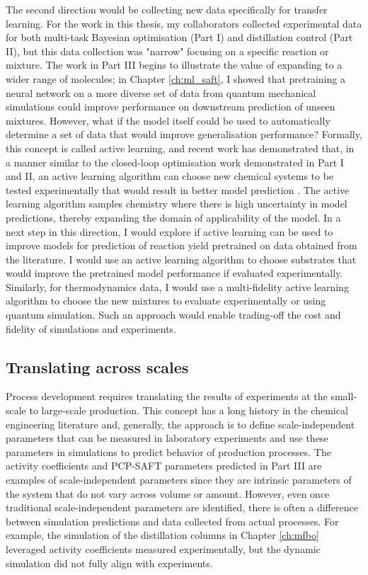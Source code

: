 The second direction would be collecting new data specifically for transfer learning. For the work in this thesis, my collaborators collected experimental data for both multi-task Bayesian optimisation (Part I) and distillation control (Part II), but this data collection was "narrow" focusing on a specific reaction or mixture. The work in Part III begins to illustrate the value of expanding to a wider range of molecules; in Chapter \ref{ch:ml_saft}, I showed that pretraining a neural network on a more diverse set of data from quantum mechanical simulations could improve performance on downstream prediction of unseen mixtures. However, what if the model itself could be used to automatically determine a set of data that would  improve generalisation performance? Formally, this concept is called active learning, and recent work has demonstrated that, in a manner similar to the closed-loop optimisation work demonstrated in Part I and II, an active learning algorithm can choose new chemical systems to be tested experimentally that would result in better model prediction \cite{Angello2022}. The active learning algorithm samples chemistry where there is high uncertainty in model predictions, thereby expanding the domain of applicability of the model.  In a next step in this direction, I would explore if active learning can be used to improve models for prediction of reaction yield pretrained on data obtained from the literature. I would use an active learning algorithm to choose substrates that would improve the pretrained model performance if evaluated experimentally. Similarly, for thermodynamics data, I would use a multi-fidelity active learning algorithm to choose the new mixtures to evaluate experimentally or using quantum simulation. Such an approach would enable trading-off the cost and fidelity of simulations and experiments. 

\subsection{Translating across scales}

Process development requires translating the results of experiments at the small-scale to large-scale production. This concept has a long history in the chemical engineering literature and, generally, the approach is to define scale-independent parameters that can be measured in laboratory experiments and use these parameters in simulations to predict behavior of production processes. The activity coefficients and PCP-SAFT parameters predicted in Part III are examples of scale-independent parameters since they are intrinsic parameters of the system that do not vary across volume or amount. However, even once traditional  scale-independent parameters are identified, there is often a difference between simulation predictions and data collected from actual processes. For example, the simulation of the distillation columns in Chapter \ref{ch:mfbo} leveraged activity coefficients measured experimentally, but the dynamic simulation did not fully align with experiments. 

